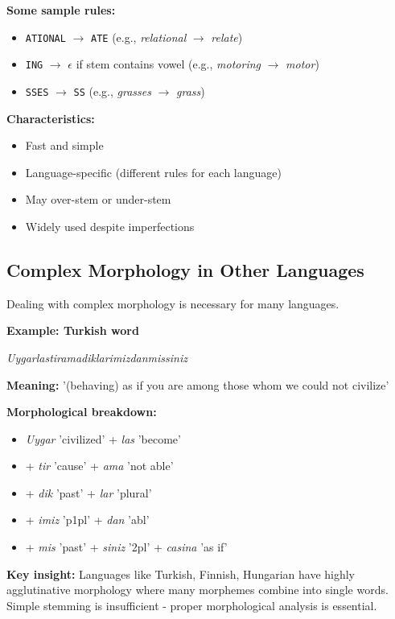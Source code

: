 \documentclass[11pt,a4paper]{article}
\theoremstyle{definition}
\theoremstyle{plain}
\theoremstyle{remark}
\begin{document}
\textbf{Some sample rules:}

\begin{itemize}
    \item \texttt{ATIONAL} $\rightarrow$ \texttt{ATE} (e.g., \textit{relational} $\rightarrow$ \textit{relate})
    \item \texttt{ING} $\rightarrow$ $\epsilon$ if stem contains vowel (e.g., \textit{motoring} $\rightarrow$ \textit{motor})
    \item \texttt{SSES} $\rightarrow$ \texttt{SS} (e.g., \textit{grasses} $\rightarrow$ \textit{grass})
\end{itemize}

\textbf{Characteristics:}
\begin{itemize}
    \item Fast and simple
    \item Language-specific (different rules for each language)
    \item May over-stem or under-stem
    \item Widely used despite imperfections
\end{itemize}

\subsection{Complex Morphology in Other Languages}

Dealing with complex morphology is necessary for many languages.

\textbf{Example: Turkish word}

\textit{Uygarlastiramadiklarimizdanmissiniz}

\textbf{Meaning:} '(behaving) as if you are among those whom we could not civilize'

\textbf{Morphological breakdown:}
\begin{itemize}
    \item \textit{Uygar} 'civilized' + \textit{las} 'become'
    \item + \textit{tir} 'cause' + \textit{ama} 'not able'
    \item + \textit{dik} 'past' + \textit{lar} 'plural'
    \item + \textit{imiz} 'p1pl' + \textit{dan} 'abl'
    \item + \textit{mis} 'past' + \textit{siniz} '2pl' + \textit{casina} 'as if'
\end{itemize}

\textbf{Key insight:} Languages like Turkish, Finnish, Hungarian have highly agglutinative morphology where many morphemes combine into single words. Simple stemming is insufficient - proper morphological analysis is essential.
\end{document}
